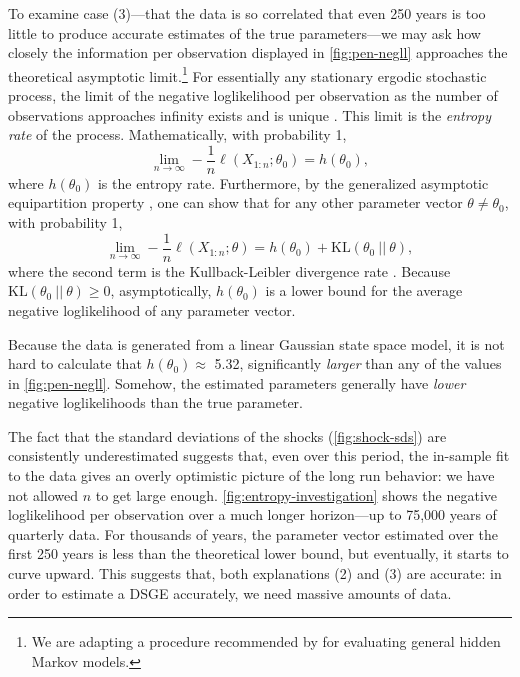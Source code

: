 \documentclass[11pt]{article}
\begin{document}
To examine case (3)---that the data is so correlated that even 250 years
is too little to produce accurate estimates of the true parameters---we
may ask how closely the information per observation displayed in
\autoref{fig:pen-negll} approaches the theoretical asymptotic
limit.\footnote{We are adapting a procedure recommended by \citet{Andy-Fraser-on-HMMs} for evaluating general hidden Markov models.}
For essentially any stationary ergodic stochastic process, the limit of
the negative loglikelihood per observation as the number of observations
approaches infinity exists and is unique \citep{Gray-entropy-2nd}. This
limit is the \emph{entropy rate} of the process. Mathematically, with
probability 1, \[
\lim_{n\rightarrow\infty} -\frac{1}{n}\ell(X_{1:n}; \theta_0) = h(\theta_0),
\] where \(h(\theta_0)\) is the entropy rate. Furthermore, by the
generalized asymptotic equipartition property
\citep{Algoet-and-Cover-on-AEP}, one can show that for any other
parameter vector \(\theta \neq \theta_0\), with probability 1, \[
\lim_{n\rightarrow\infty} -\frac{1}{n}\ell(X_{1:n}; \theta) = h(\theta_0) + \mathrm{KL}(\theta_0\ ||\ \theta),
\] where the second term is the Kullback-Leibler divergence rate
\citep{Gray-entropy-2nd}. Because
\(\mathrm{KL}(\theta_0\ ||\ \theta) \geq 0\), asymptotically,
\(h(\theta_0)\) is a lower bound for the average negative loglikelihood
of any parameter vector.

Because the data is generated from a linear Gaussian state space model,
it is not hard to calculate that \(h(\theta_0) \approx\) 5.32,
significantly \emph{larger} than any of the values in
\autoref{fig:pen-negll}. Somehow, the estimated parameters generally
have \emph{lower} negative loglikelihoods than the true parameter.

The fact that the standard deviations of the shocks
(\autoref{fig:shock-sds}) are consistently underestimated suggests that,
even over this period, the in-sample fit to the data gives an overly
optimistic picture of the long run behavior: we have not allowed \(n\)
to get large enough. \autoref{fig:entropy-investigation} shows the
negative loglikelihood per observation over a much longer horizon---up
to 75,000 years of quarterly data. For thousands of years, the parameter
vector estimated over the first 250 years is less than the theoretical
lower bound, but eventually, it starts to curve upward. This suggests
that, both explanations (2) and (3) are accurate: in order to estimate a
DSGE accurately, we need massive amounts of data.
\end{document}
